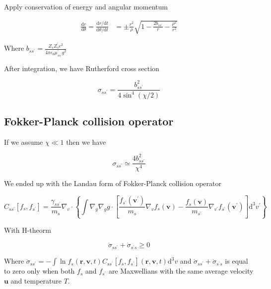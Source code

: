Apply conservation of energy and angular momentum

\begin{equation}
\begin{aligned} \frac{\mathrm{d} r}{\mathrm{d} \theta}=\frac{\mathrm{d} r / \mathrm{d} t}{\mathrm{d} \theta / \mathrm{d} t} &=\pm \frac{r^{2}}{\rho} \sqrt{1-\frac{2 b_{s s^{\prime}}}{r}-\frac{\rho^{2}}{r^{2}}}
\end{aligned}
\end{equation}

Where $b_{s s^{\prime}}=\frac{Z_{s} Z_{s}^{\prime} e^{2}}{4 \pi \epsilon_{0} \mu_{s s^{\prime}}^{\prime} g^{2}}$

After integration, we have Rutherford cross section

\begin{equation}
\sigma_{s s^{\prime}}=\frac{b_{s s^{\prime}}^{2}}{4 \sin ^{4}(\chi / 2)}
\end{equation}

\subsection{Fokker-Planck collision operator}

If we assume $\chi \ll 1$ then we have

\begin{equation}
\sigma_{s s^{\prime}} \simeq \frac{4 b_{s s^{\prime}}^{2}}{\chi^{4}}
\end{equation}

We ended up with the Landau form of Fokker-Planck
collision operator

\begin{equation}
C_{s s^{\prime}}\left[f_{s}, f_{s^{\prime}}\right]=\frac{\gamma_{s s^{\prime}}}{m_{s}} \nabla_{v} \cdot\left\{\int \nabla_{g} \nabla_{g} g \cdot\left[\frac{f_{s^{\prime}}\left(\mathbf{v}^{\prime}\right)}{m_{s}} \nabla_{v} f_{s}(\mathbf{v})-\frac{f_{s}(\mathbf{v})}{m_{s^{\prime}}} \nabla_{v^{\prime}} f_{s^{\prime}}\left(\mathbf{v}^{\prime}\right)\right] \mathrm{d}^{3} v^{\prime}\right\}
\end{equation}

With H-theorm

\begin{equation}
\dot{\sigma}_{s s^{\prime}}+\dot{\sigma}_{s^{\prime} s} \geqslant 0
\end{equation}

Where $\dot{\sigma}_{s s^{\prime}}=-\int \ln f_{s}(\mathbf{r}, \mathbf{v}, t) C_{s s^{\prime}}\left[f_{s}, f_{s^{\prime}}\right](\mathbf{r}, \mathbf{v}, t) \mathrm{d}^{3} v$
and $\dot{\sigma}_{s s^{\prime}}+\dot{\sigma}_{s^{\prime} s}$ is equal to zero only when both $f_{s}$ and $f_{s^{\prime}}$ are Maxwellians with the same
average velocity $\mathbf{u}$ and temperature $T$.

